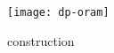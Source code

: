 \begin{figure}[!ht]
	\centering
	\texttt{[image: dp-oram]}
	\caption{\epsolute{} construction}%
	\label{figure:dp-oram}
\end{figure}
